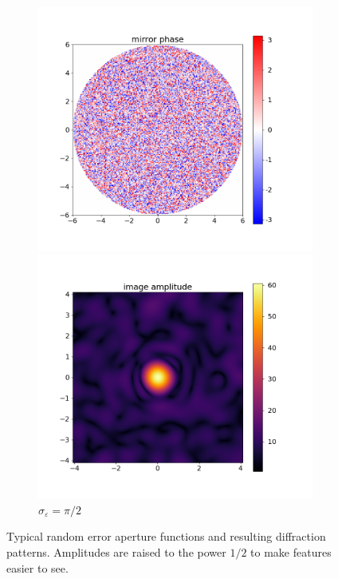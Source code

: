 \documentclass[11pt]{article}
\newcommand{\eps}{\varepsilon}
\begin{document}
\begin{figure}
    \begin{subfigure}{\textwidth}
        \begin{minipage}{0.5\textwidth}
            \includegraphics[width=\textwidth]{pictures/error_pics/errors1in_phase.png}
        \end{minipage}%
        \hfill
        \begin{minipage}{0.5\textwidth}
            \includegraphics[width=\textwidth]{pictures/error_pics/errors1out_abs.png}
        \end{minipage}
        \caption{$\sigma_{\eps} = \pi/2$}\label{fig:randpic:2}
    \end{subfigure}
    \caption{Typical random error aperture functions and resulting diffraction patterns. Amplitudes are raised to the power $1/2$ to make features easier to see.}\label{fig:randpic}
\end{figure}
\end{document}
